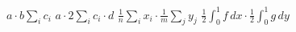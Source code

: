 \documentclass{article}
\begin{document}
$a\cdot b\sum_i c_i$ $a\cdot 2\sum_i c_i\cdot d$ $\frac1n\sum_i x_i\cdot\frac1m\sum_j y_j$ $\frac12\int_0^1 f\,dx\cdot\frac12\int_0^1 g\,dy$
\end{document}
